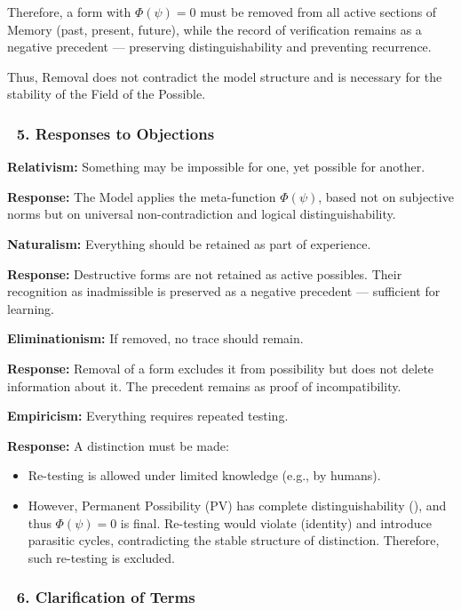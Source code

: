 \documentclass[12pt]{article}
\begin{document}
Therefore, a form with $\Phi(\psi) = 0$ must be removed from all active sections of Memory (past, present, future), while the record of verification remains as a negative precedent — preserving distinguishability and preventing recurrence.

Thus, Removal does not contradict the model structure and is necessary for the stability of the Field of the Possible.

\subsubsection*{🔹 5. Responses to Objections}

\textbf{Relativism:} Something may be impossible for one, yet possible for another.

\textbf{Response:} The Model applies the meta-function $\Phi(\psi)$, based not on subjective norms but on universal non-contradiction and logical distinguishability.

\bigskip

\textbf{Naturalism:} Everything should be retained as part of experience.

\textbf{Response:} Destructive forms are not retained as active possibles. Their recognition as inadmissible is preserved as a negative precedent — sufficient for learning.

\bigskip

\textbf{Eliminationism:} If removed, no trace should remain.

\textbf{Response:} Removal of a form excludes it from possibility but does not delete information about it. The precedent remains as proof of incompatibility.

\bigskip

\textbf{Empiricism:} Everything requires repeated testing.

\textbf{Response:} A distinction must be made:

\begin{itemize}
\item Re-testing is allowed under limited knowledge (e.g., by humans).
\item However, Permanent Possibility (PV) has complete distinguishability (\text{[11.1.1]}), and thus $\Phi(\psi) = 0$ is final.
Re-testing would violate \text{[9.2]} (identity) and introduce parasitic cycles, contradicting the stable structure of distinction. Therefore, such re-testing is excluded.
\end{itemize}

\subsubsection*{🔹 6. Clarification of Terms}
\end{document}
